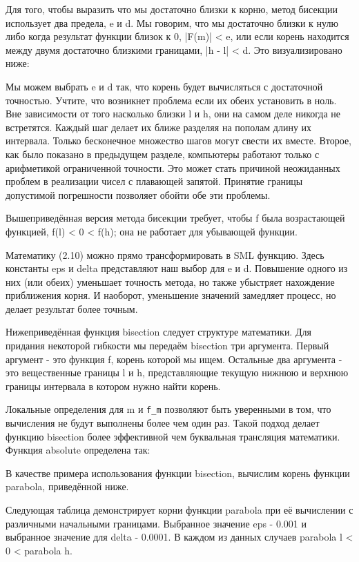 Для того, чтобы выразить что мы достаточно близки к корню, метод бисекции использует два предела, e и d. Мы говорим, что мы достаточно близки к нулю либо когда результат функции близок к 0, |F(m)| < e, или если корень находится между двумя достаточно близкими границами, |h - l| < d. Это визуализировано ниже:

Мы можем выбрать e и d так, что корень будет вычисляться с достаточной точностью. Учтите, что возникнет проблема если их обеих установить в ноль. Вне зависимости от того насколько близки l и h, они на самом деле никогда не встретятся. Каждый шаг делает их ближе разделяя на пополам длину их интервала. Только бесконечное множество шагов могут свести их вместе. Второе, как было показано в предыдущем разделе, компьютеры работают только с арифметикой ограниченной точности. Это может стать причиной неожиданных проблем в реализации чисел с плавающей запятой. Принятие границы допустимой погрешности позволяет обойти обе эти проблемы.

Вышеприведённая версия метода бисекции требует, чтобы f была возрастающей функцией, f(l) < 0 < f(h); она не работает для убывающей функции.

Математику (2.10) можно прямо трансформировать в SML функцию. Здесь константы eps и delta представляют наш выбор для e и d. Повышение одного из них (или обеих) уменьшает точность метода, но также убыстряет нахождение приближения корня. И наоборот, уменьшение значений замедляет процесс, но делает результат более точным.

Нижеприведённая функция bisection следует структуре математики. Для придания некоторой гибкости мы передаём bisection три аргумента. Первый аргумент - это функция f, корень которой мы ищем. Остальные два аргумента - это вещественные границы l и h, представляющие текущую нижнюю и верхнюю границы интервала в котором нужно найти корень.

Локальные определения для m и \lstinline|f_m| позволяют быть уверенными в том, что вычисления не будут выполнены более чем один раз. Такой подход делает функцию bisection более эффективной чем буквальная трансляция математики. Функция absolute определена так:

В качестве примера использования функции bisection, вычислим корень функции parabola, приведённой ниже.

Следующая таблица демонстрирует корни функции parabola при её вычислении с различными начальными границами. Выбранное значение eps - 0.001 и выбранное значение для delta - 0.0001. В каждом из данных случаев parabola l < 0 < parabola h.

